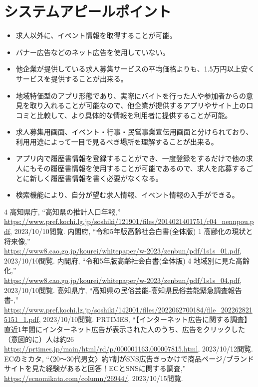 \documentclass[a4paper,dvipdfmx]{jarticle}
\begin{document}
\section{システムアピールポイント}
\begin{itemize}
    \item 求人以外に、イベント情報を取得することが可能。
    \item バナー広告などのネット広告を使用していない。
    \item 他企業が提供している求人募集サービスの平均価格よりも、1.5万円以上安くサービスを提供することが出来る。
    \item 地域特価型のアプリ形態であり、実際にバイトを行った人や参加者からの意見を取り入れることが可能なので、他企業が提供するアプリやサイト上の口コミと比較して、より具体的な情報を利用者に提供することが可能。
    \item 求人募集用画面、イベント・行事・民営事業宣伝用画面と分けられており、利用用途によって一目で見るべき場所を理解することが出来る。
    \item アプリ内で履歴書情報を登録することができ、一度登録をするだけで他の求人にもその履歴書情報を使用することが可能であるので、求人を応募するごとに新しく履歴書情報を書く必要がなくなる。
    \item 検索機能により、自分が望む求人情報、イベント情報の入手ができる。
\end{itemize}
\begin{thebibliography}{4}
    高知県庁,
    ``高知県の推計人口年報,''\\
    \url{https://www.pref.kochi.lg.jp/soshiki/121901/files/2014021401751/r04_nennpou.pdf}, 2023/10/10閲覧.
    内閣府,
    ``令和5年版高齢社会白書(全体版) 1 高齢化の現状と将来像,''\\
    \url{https://www8.cao.go.jp/kourei/whitepaper/w-2023/zenbun/pdf/1s1s_01.pdf}, 2023/10/10閲覧.
    内閣府,
    ``令和5年版高齢社会白書(全体版) 4 地域別に見た高齢化,''\\
    \url{https://www8.cao.go.jp/kourei/whitepaper/w-2023/zenbun/pdf/1s1s_04.pdf}, 2023/10/10閲覧.
    高知県庁,
    ``高知県の民俗芸能-高知県民俗芸能緊急調査報告書-,''\\
    \url{https://www.pref.kochi.lg.jp/soshiki/142001/files/2022062700184/file_2022628215151_1.pdf}, 2023/10/10閲覧.
    PRTIMES,
    ``【インターネット広告に関する調査】直近1年間にインターネット広告が表示された人のうち、広告をクリックした（意図的に）人は約26%
    \url{https://prtimes.jp/main/html/rd/p/000001163.000007815.html}, 2023/10/12閲覧.
    ECのミカタ,
    ``〈20〜30代男女〉約7割がSNS広告きっかけで商品ページ/ブランドサイトを見た経験があると回答！ECとSNSに関する調査,''\\
    \url{https://ecnomikata.com/column/26944/}, 2023/10/15閲覧.
\end{thebibliography}
\end{document}
